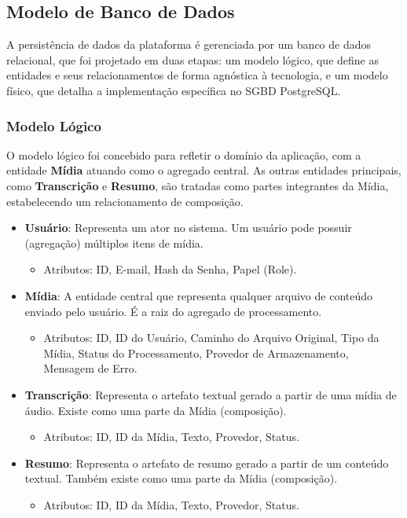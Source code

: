 \subsection{Modelo de Banco de Dados}
\label{sec:modelo_bd}

A persistência de dados da plataforma é gerenciada por um banco de dados relacional, que foi projetado em duas etapas: um modelo lógico, que define as entidades e seus relacionamentos de forma agnóstica à tecnologia, e um modelo físico, que detalha a implementação específica no SGBD PostgreSQL.

\subsubsection{Modelo Lógico}

O modelo lógico foi concebido para refletir o domínio da aplicação, com a entidade \textbf{Mídia} atuando como o agregado central. As outras entidades principais, como \textbf{Transcrição} e \textbf{Resumo}, são tratadas como partes integrantes da Mídia, estabelecendo um relacionamento de composição.

\begin{itemize}
    \item \textbf{Usuário}: Representa um ator no sistema. Um usuário pode possuir (agregação) múltiplos itens de mídia.
        \begin{itemize}
            \item Atributos: ID, E-mail, Hash da Senha, Papel (Role).
        \end{itemize}

    \item \textbf{Mídia}: A entidade central que representa qualquer arquivo de conteúdo enviado pelo usuário. É a raiz do agregado de processamento.
        \begin{itemize}
            \item Atributos: ID, ID do Usuário, Caminho do Arquivo Original, Tipo da Mídia, Status do Processamento, Provedor de Armazenamento, Mensagem de Erro.
        \end{itemize}

    \item \textbf{Transcrição}: Representa o artefato textual gerado a partir de uma mídia de áudio. Existe como uma parte da Mídia (composição).
        \begin{itemize}
            \item Atributos: ID, ID da Mídia, Texto, Provedor, Status.
        \end{itemize}

    \item \textbf{Resumo}: Representa o artefato de resumo gerado a partir de um conteúdo textual. Também existe como uma parte da Mídia (composição).
        \begin{itemize}
            \item Atributos: ID, ID da Mídia, Texto, Provedor, Status.
        \end{itemize}
\end{itemize}

